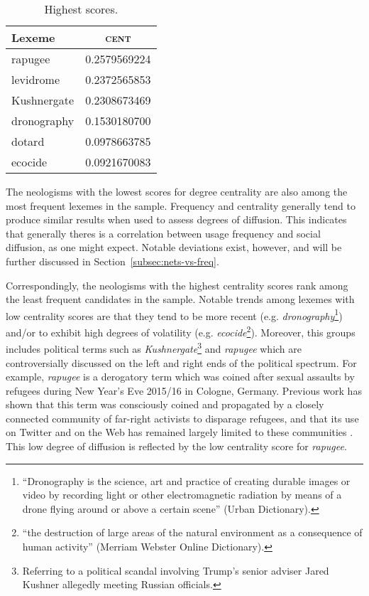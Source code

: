 \documentclass[
  a4paper,
  abstract=on,
  captions=tableabove,
  ]{scrartcl}
\newcommand{\ol}[1]{\emph{#1}}
\begin{document}
\begin{table}
\begin{subtable}{.3\linewidth}
          \centering
          \caption{Highest scores.}
          \begin{tabular}{l S[table-format=1.4, round-mode=places, round-precision=4]}
            \toprule
            Lexeme      & {\textsc{cent}} \\
            \midrule
            rapugee     & 0.2579569224 \\
            levidrome   & 0.2372565853 \\
            Kushnergate	& 0.2308673469 \\
            dronography	& 0.1530180700 \\
            dotard      & 0.0978663785 \\
            ecocide     & 0.0921670083 \\
            \bottomrule
          \end{tabular}
        \end{subtable}
      \end{table}

      The neologisms with the lowest scores for degree centrality are also among the most frequent lexemes in the sample. Frequency and centrality generally tend to produce similar results when used to assess degrees of diffusion. This indicates that generally theres is a correlation between usage frequency and social diffusion, as one might expect. Notable deviations exist, however, and will be further discussed in Section~\ref{subsec:nets-vs-freq}. 

      Correspondingly, the neologisms with the highest centrality scores rank among the least frequent candidates in the sample. Notable trends among lexemes with low centrality scores are that they tend to be more recent (e.g. \ol{dronography}\footnote{\enquote{Dronography is the science, art and practice of creating durable images or video by recording light or other electromagnetic radiation by means of a drone flying around or above a certain scene} (Urban Dictionary).}) and/or to exhibit high degrees of volatility (e.g. \ol{ecocide}\footnote{\enquote{the destruction of large areas of the natural environment as a consequence of human activity} (Merriam Webster Online Dictionary).}). Moreover, this groups includes political terms such as \ol{Kushnergate}\footnote{Referring to a political scandal involving Trump's senior adviser Jared Kushner allegedly meeting Russian officials.} and \ol{rapugee} which are controversially discussed on the left and right ends of the political spectrum. For example, \ol{rapugee} is a derogatory term which was coined after sexual assaults by refugees during New Year's Eve 2015/16 in Cologne, Germany. Previous work has shown that this term was consciously coined and propagated by a closely connected community of far-right activists to disparage refugees, and that its use on Twitter and on the Web has remained largely limited to these communities \parencite{Wurschinger2016UsingWeb}. This low degree of diffusion is reflected by the low centrality score for \ol{rapugee}.
\end{document}
